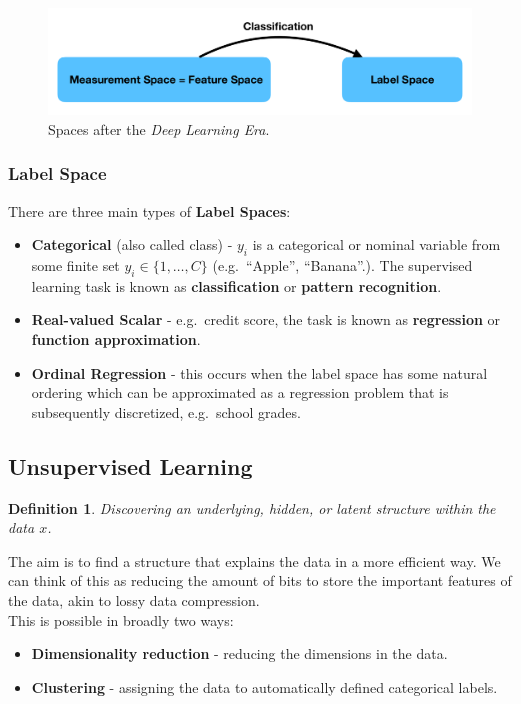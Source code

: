 \documentclass[11pt]{article}
\newtheorem{defn}{Definition}
\begin{document}
\begin{figure}[h]
  \caption{Spaces after the \textit{Deep Learning Era}.}
  \includegraphics[scale=0.2]{spacesafter}
  \centering
\end{figure}

\subsubsection{Label Space}
There are three main types of \textbf{Label Spaces}:
\begin{itemize}
  \item \textbf{Categorical} (also called class) - $y_i$ is a categorical or nominal variable from some finite set $y_i \in \{1, \ldots, C \}$ (e.g.\ ``Apple'', ``Banana''.).
    The supervised learning task is known as \textbf{classification} or \textbf{pattern recognition}.
  \item \textbf{Real-valued Scalar} - e.g.\ credit score, the task is known as \textbf{regression} or \textbf{function approximation}.
  \item \textbf{Ordinal Regression} - this occurs when the label space has some natural ordering which can be approximated as a regression problem that is subsequently discretized, e.g.\ school grades.
\end{itemize}

\subsection{Unsupervised Learning}
\begin{defn}
Discovering an underlying, hidden, or latent structure within the data $x$.
\end{defn}

The aim is to find a structure that explains the data in a more efficient way.
We can think of this as reducing the amount of bits to store the important features of the data, akin to lossy data compression. \\

This is possible in broadly two ways:
\begin{itemize}
  \item \textbf{Dimensionality reduction} - reducing the dimensions in the data.
  \item \textbf{Clustering} - assigning the data to automatically defined categorical labels.
\end{itemize}
\end{document}
